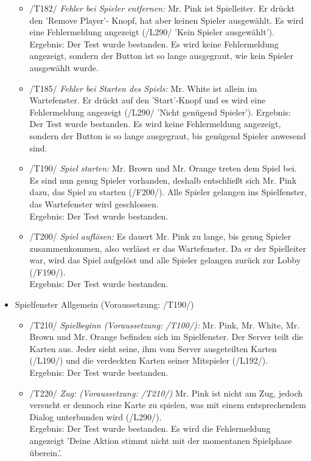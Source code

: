 \documentclass[a4paper]{article}
\begin{document}
\begin{itemize}
\begin{itemize}
		\item /T182/ \textit{Fehler bei Spieler entfernen:} Mr. Pink ist Spielleiter. Er drückt den 'Remove Player'-				Knopf, hat aber keinen Spieler ausgewählt. Es wird eine Fehlermeldung angezeigt (/L290/ 'Kein Spieler ausgewählt'). 		\\
		Ergebnis: Der Test wurde bestanden. Es wird keine Fehlermeldung angezeigt, sondern der Button ist so lange 				ausgegraut, wie kein Spieler ausgewählt wurde. 
		
		\item /T185/ \textit{Fehler bei Starten des Spiels:} Mr. White ist allein im Wartefenster. Er drückt auf den 				'Start'-Knopf und es wird eine Fehlermeldung angezeigt (/L290/ 'Nicht genügend Spieler').
		Ergebnis: Der Test wurde bestanden. Es wird keine Fehlermeldung angezeigt, sondern der Button is so lange 				ausgegraut, bis genügend Spieler anwesend sind.
		
		\item /T190/ \textit{Spiel starten:} Mr. Brown und Mr. Orange treten dem Spiel bei. Es sind nun genug Spieler 				vorhanden, deshalb entschließt sich Mr. Pink dazu, das Spiel zu starten (/F200/). Alle Spieler gelangen ins 					Spielfenster, das Wartefenster wird geschlossen. \\
		Ergebnis: Der Test wurde bestanden.
		
		\item /T200/ \textit{Spiel auflösen:} Es dauert Mr. Pink zu lange, bis genug Spieler zusammenkommen, also verlässt 			er das Wartefenster. Da er der Spielleiter war, wird das Spiel aufgelöst und alle Spieler gelangen zurück 			zur Lobby (/F190/). \\
		Ergebnis: Der Test wurde bestanden.
		
	\end{itemize}
	\item Spielfenster Allgemein (Voraussetzung: /T190/)
	\begin{itemize}
	
		\item /T210/ \textit{Spielbeginn (Voraussetzung: /T100/):} Mr. Pink, Mr. White, Mr. Brown und Mr. Orange befinden 			sich im Spielfenster. Der Server teilt die Karten aus. Jeder sieht seine, ihm vom Server ausgeteilten 				Karten (/L190/) und die verdeckten Karten seiner Mitspieler (/L192/).   \\
		Ergebnis: Der Test wurde bestanden.
		
		\item /T220/ \textit{Zug: (Voraussetzung: /T210/)} Mr. Pink ist nicht am Zug, jedoch versucht er dennoch eine Karte 			zu spielen, was mit einem entsprechendem Dialog  unterbunden wird (/L290/). \\
		Ergebnis: Der Test wurde bestanden. Es wird die Fehlermeldung angezeigt 'Deine Aktion stimmt nicht mit der 				momentanen Spielphase überein.'.
		

\end{itemize}
\end{itemize}
\end{document}
